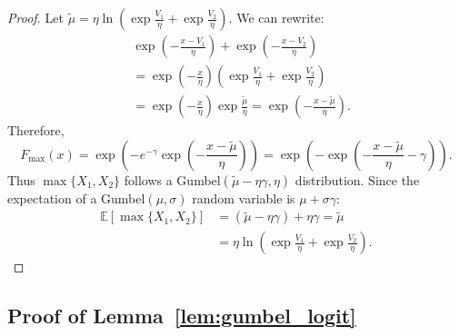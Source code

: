 \documentclass[12pt]{article}
\theoremstyle{plain}
\begin{document}
\begin{proof}
	Let $\tilde{\mu} = \eta \ln\left(\exp\frac{V_1}{\eta} +
		\exp\frac{V_2}{\eta}\right)$. We can rewrite:
	\begin{align*}
		 & \exp\left(-\frac{x - V_1}{\eta}\right) + \exp\left(-\frac{x - V_2}{\eta}\right)                                   \\
		 & = \exp\left(-\frac{x}{\eta}\right)\left(\exp\frac{V_1}{\eta} + \exp\frac{V_2}{\eta}\right)                        \\
		 & = \exp\left(-\frac{x}{\eta}\right) \exp\frac{\tilde{\mu}}{\eta} = \exp\left(-\frac{x - \tilde{\mu}}{\eta}\right).
	\end{align*}
	Therefore,
	\begin{equation*}
		F_{\max}(x) = \exp\left(-e^{-\gamma}\exp\left(-\frac{x - \tilde{\mu}}{\eta}\right)\right) = \exp\left(-\exp\left(-\frac{x - \tilde{\mu}}{\eta} - \gamma\right)\right).
	\end{equation*}
	Thus $\max\{X_1, X_2\}$ follows a Gumbel$(\tilde{\mu} - \eta\gamma, \eta)$
	distribution. Since the expectation of a Gumbel$(\mu, \sigma)$ random variable
	is $\mu + \sigma\gamma$:
	\begin{align*}
		\mathbb{E}[\max\{X_1, X_2\}] & = (\tilde{\mu} - \eta\gamma) + \eta\gamma = \tilde{\mu}             \\
		                             & = \eta \ln\left(\exp\frac{V_1}{\eta} + \exp\frac{V_2}{\eta}\right).
	\end{align*}
\end{proof}

\subsection{Proof of Lemma~\ref{lem:gumbel_logit}}\label{app:proof_gumbel_logit}
\end{document}

